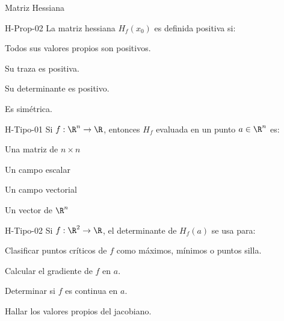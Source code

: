 \documentclass[a4,11pt]{aleph-notas}
\begin{document}
\begin{quiz}{Matriz Hessiana}
\begin{multi}[]%
    {H-Prop-02}
    La matriz hessiana $H_f({x}_0)$ es definida positiva si:
    \item* Todos sus valores propios son positivos.
    \item Su traza es positiva.
    \item Su determinante es positivo.
    \item Es simétrica.
\end{multi}

\begin{multi}[]%
    {H-Tipo-01}
    Si $f:\R^n\to\R$, entonces $H_f$ evaluada en un punto ${a}\in\R^n$ es:
    \item* Una matriz de $n\times n$
    \item Un campo escalar
    \item Un campo vectorial
    \item Un vector de $\R^n$
\end{multi}

\begin{multi}[]%
    {H-Tipo-02}
    Si $f:\R^2\to\R$, el determinante de $H_f({a})$ se usa para:
    \item* Clasificar puntos críticos de $f$ como máximos, mínimos o puntos silla.
    \item Calcular el gradiente de $f$ en ${a}$.
    \item Determinar si $f$ es continua en ${a}$.
    \item Hallar los valores propios del jacobiano.
\end{multi}

\end{quiz}
\end{document}

